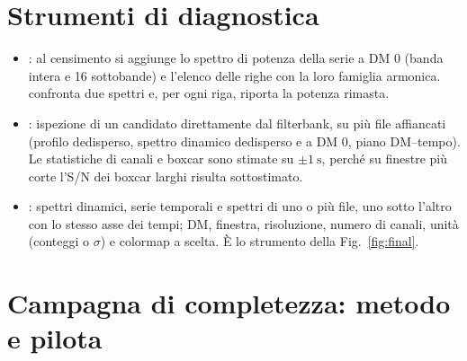 \FloatBarrier
\section{Strumenti di diagnostica}
\label{sec:diag}

\begin{itemize}
  \item {}: al censimento si aggiunge lo spettro di potenza della serie a DM 0
    (banda intera e 16 sottobande) e l'elenco delle righe con la loro famiglia armonica.
     confronta due spettri e, per ogni riga, riporta la potenza rimasta.
  \item {}: ispezione di un candidato direttamente dal filterbank, su più file affiancati
    (profilo dedisperso, spettro dinamico dedisperso e a DM 0, piano DM--tempo). Le statistiche di canali e boxcar sono
    stimate su $\pm\SI{1}{\second}$, perché su finestre più corte l'S/N dei boxcar larghi risulta sottostimato.
  \item {}: spettri dinamici, serie temporali e spettri di uno o più file, uno sotto l'altro con
    lo stesso asse dei tempi; DM, finestra, risoluzione, numero di canali, unità (conteggi o $\sigma$) e colormap a scelta.
    È lo strumento della Fig.~\ref{fig:final}.
\end{itemize}

\FloatBarrier
\section{Campagna di completezza: metodo e pilota}
\label{sec:completeness}


